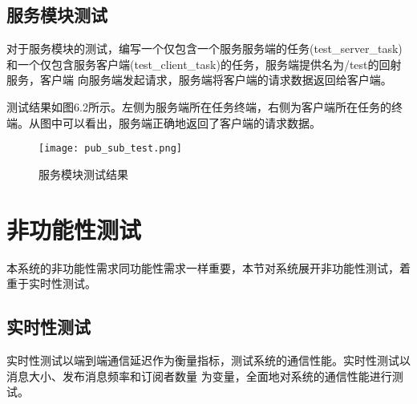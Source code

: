 \subsection{服务模块测试}
对于服务模块的测试，编写一个仅包含一个服务服务端的任务(test\_server\_task)和一个仅包含服务客户端(test\_client\_task)的任务，服务端提供名为/test的回射服务，客户端
向服务端发起请求，服务端将客户端的请求数据返回给客户端。


测试结果如图6.2所示。左侧为服务端所在任务终端，右侧为客户端所在任务的终端。从图中可以看出，服务端正确地返回了客户端的请求数据。
\begin{figure}[H]
  \centering
  \texttt{[image: pub\_sub\_test.png]}
  \caption{服务模块测试结果}
  \label{pub_sub_test}
\end{figure}
\section{非功能性测试}
本系统的非功能性需求同功能性需求一样重要，本节对系统展开非功能性测试，着重于实时性测试。

\subsection{实时性测试}
实时性测试以端到端通信延迟作为衡量指标，测试系统的通信性能。实时性测试以消息大小、发布消息频率和订阅者数量
为变量，全面地对系统的通信性能进行测试。
